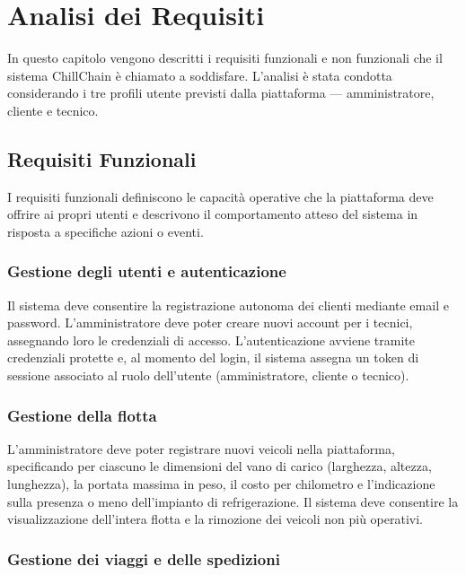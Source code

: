\chapter{Analisi dei Requisiti}
\label{ch:requisiti}

In questo capitolo vengono descritti i requisiti funzionali e non funzionali che il sistema ChillChain è chiamato a soddisfare. L'analisi è stata condotta considerando i tre profili utente previsti dalla piattaforma --- amministratore, cliente e tecnico.

\section{Requisiti Funzionali}

I requisiti funzionali definiscono le capacità operative che la piattaforma deve offrire ai propri utenti e descrivono il comportamento atteso del sistema in risposta a specifiche azioni o eventi.

\subsection{Gestione degli utenti e autenticazione}

Il sistema deve consentire la registrazione autonoma dei clienti mediante email e password. L'amministratore deve poter creare nuovi account per i tecnici, assegnando loro le credenziali di accesso. L'autenticazione avviene tramite credenziali protette e, al momento del login, il sistema assegna un token di sessione associato al ruolo dell'utente (amministratore, cliente o tecnico).

\subsection{Gestione della flotta}

L'amministratore deve poter registrare nuovi veicoli nella piattaforma, specificando per ciascuno le dimensioni del vano di carico (larghezza, altezza, lunghezza), la portata massima in peso, il costo per chilometro e l'indicazione sulla presenza o meno dell'impianto di refrigerazione. Il sistema deve consentire la visualizzazione dell'intera flotta e la rimozione dei veicoli non più operativi.

\subsection{Gestione dei viaggi e delle spedizioni}

